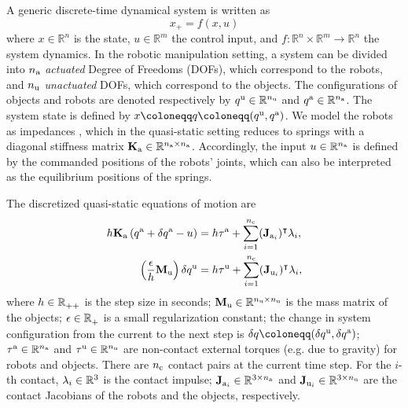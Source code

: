 A generic discrete-time dynamical system is written as
\begin{equation}
\label{eq:f_x_u}
x_+ = f(x, u) 
\end{equation}
where $x \in \mathbb{R}^n$ is the state, $u \in \mathbb{R}^m$ the control input, and $f: \mathbb{R}^n\times\mathbb{R}^m\rightarrow\mathbb{R}^n$ the system dynamics. 
In the robotic manipulation setting, a system can be divided into $\nA$ \emph{actuated} Degree of Freedoms (DOFs), which correspond to the robots, and $\nU$ \emph{unactuated} DOFs, which correspond to the objects. The configurations of objects and robots are denoted respectively by $\qu \in \R[\nU]$ and $\qa \in \R[\nA]$. The system state is defined by $x \coloneqq q \coloneqq (\qu, \qa)$. We model the robots as impedances \cite{hogan1985impedance}, which in the quasi-static setting reduces to springs with a diagonal stiffness matrix $\Ka \in \R[\nA \times \nA]$. Accordingly, the input $u \in \R[\nA]$ is defined by the commanded positions of the robots' joints, which can also be interpreted as the equilibrium positions of the springs.

The discretized quasi-static equations of motion are
\begin{subequations}
\label{eq:q_dynamics_eom}
\begin{align} 
h \Ka \left(\qa + \dqa - u \right) &= h\tauA + \sum_{i=1}^{\nC} (\Ja[i])^\intercal \lambda_i, \label{eq:q_dynamics_eom:a}\\
\left( \frac{\epsilon}{h} \Mu \right) \dqu &= h\tauU + \sum_{i=1}^{\nC} (\Ju[i])^\intercal \lambda_i, \label{eq:q_dynamics_eom:u}
\end{align}
\end{subequations}
where $h \in \R_{++}$ is the step size in seconds; $\Mu \in \R[\nU \times \nU]$ is the mass matrix of the objects; $\epsilon \in \R_{+}$ is a small regularization constant; the change in system configuration from the current to the next step is $\dq \coloneqq (\dqu, \dqa)$; $\tauA \in \R[\nA]$ and $\tauU \in \R[\nU]$ are non-contact external torques (e.g. due to gravity) for robots and objects. There are $\nC$ contact pairs at the current time step. For the $i$-th contact, $\lambda_i \in \R[3]$ is the contact impulse; $\Ja[i] \in \R[3 \times \nA]$ and $\Ju[i] \in \R[3 \times \nU]$ are the contact Jacobians \cite{anitescu1996formulating} of the robots and the objects, respectively.

